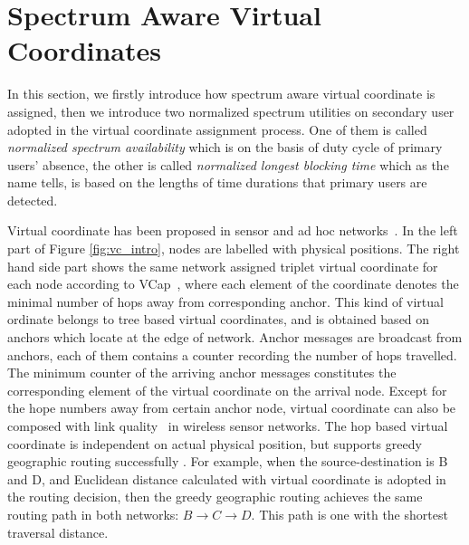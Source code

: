 \section{Spectrum Aware Virtual Coordinates}
In this section, we firstly introduce how spectrum aware virtual coordinate is assigned, then we introduce two normalized spectrum utilities on secondary user adopted in the virtual coordinate assignment process.
One of them is called \textit{normalized spectrum availability} which is on the basis of duty cycle of primary users' absence, the other is called \textit{normalized longest blocking time} which as the name tells, is based on the lengths of time durations that primary users are detected.

Virtual coordinate has been proposed in sensor and ad hoc networks~\cite{gpsfree05infocom,Alizai_11_probabilisticAddressing}.
In the left part of Figure \ref{fig:vc_intro}, nodes are labelled with physical positions.
The right hand side part shows the same network assigned triplet virtual coordinate for each node according to VCap~\cite{gpsfree05infocom}, where each element of the coordinate denotes the minimal number of hops away from corresponding anchor.
This kind of virtual ordinate belongs to tree based virtual coordinates, and is obtained based on anchors which locate at the edge of network.
Anchor messages are broadcast from anchors, each of them contains a counter recording the number of hops travelled.
The minimum counter of the arriving anchor messages constitutes the corresponding element of the virtual coordinate on the arrival node.
Except for the hope numbers away from certain anchor node, virtual coordinate can also be composed with link quality~\cite{Alizai_11_probabilisticAddressing} in wireless sensor networks.
The hop based virtual coordinate is independent on actual physical position, but %
supports greedy geographic routing successfully \cite{gpsfree05infocom, Alizai_11_probabilisticAddressing}.
For example, when the source-destination is B and D, and Euclidean distance calculated with virtual coordinate is adopted in the routing decision, then the greedy geographic routing achieves the same routing path in both networks: $B\rightarrow C\rightarrow D$. This path is one with the shortest traversal distance.


